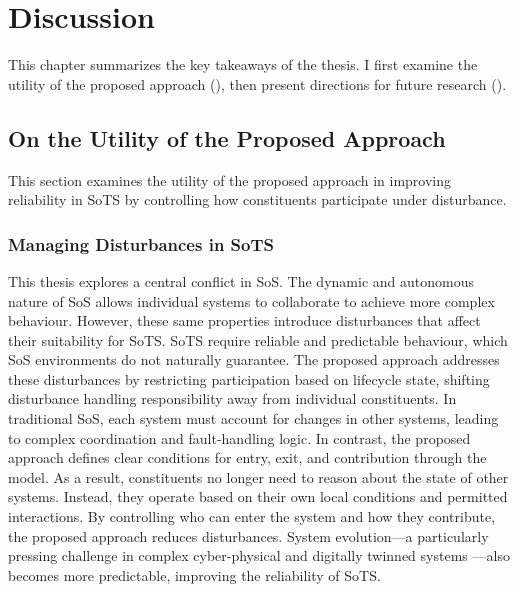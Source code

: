 \chapter{Discussion}\label{ch:discussion}
This chapter summarizes the key takeaways of the thesis. I first examine the utility of the proposed approach (), then present directions for future research ().

\section{On the Utility of the Proposed Approach}\label{sec:discussion-utility}
This section examines the utility of the proposed approach in improving reliability in SoTS by controlling how constituents participate under disturbance.

\subsection{Managing Disturbances in SoTS}
This thesis explores a central conflict in SoS. The dynamic and autonomous nature of SoS allows individual systems to collaborate to achieve more complex behaviour. However, these same properties introduce disturbances that affect their suitability for SoTS. SoTS require reliable and predictable behaviour, which SoS environments do not naturally guarantee. The proposed approach addresses these disturbances by restricting participation based on lifecycle state, shifting disturbance handling responsibility away from individual constituents. In traditional SoS, each system must account for changes in other systems, leading to complex coordination and fault-handling logic. In contrast, the proposed approach defines clear conditions for entry, exit, and contribution through the model. As a result, constituents no longer need to reason about the state of other systems. Instead, they operate based on their own local conditions and permitted interactions. By controlling who can enter the system and how they contribute, the proposed approach reduces disturbances. System evolution---a particularly pressing challenge in complex cyber-physical and digitally twinned systems \cite{david2023towards}---also becomes more predictable, improving the reliability of SoTS.

